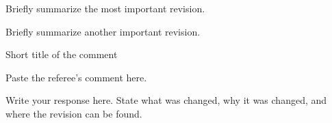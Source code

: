 \documentclass{paperreply}
\begin{document}
\PaperReplyMakeTitle

\begin{revisionsummary}
\item Briefly summarize the most important revision.
\item Briefly summarize another important revision.
\end{revisionsummary}


\begin{replypoint}[Revised]{Short title of the comment}
\begin{refereecomment}
Paste the referee's comment here.
\end{refereecomment}

\begin{authorreply}
Write your response here. State what was changed, why it was changed, and where the revision can be found.

\end{authorreply}
\end{replypoint}
\end{document}
